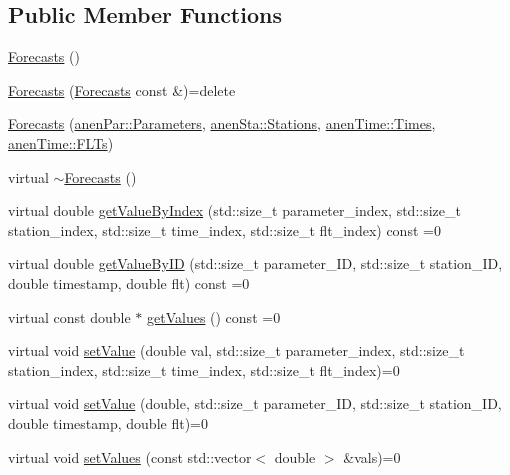 \subsection*{Public Member Functions}
\begin{DoxyCompactItemize}
\item 
\mbox{\hyperlink{class_forecasts_a2614be37bc63171f7d2b9d8b9f9d8871}{Forecasts}} ()
\item 
\mbox{\hyperlink{class_forecasts_a6f47e34b9ae9bb9496149208e3246d65}{Forecasts}} (\mbox{\hyperlink{class_forecasts}{Forecasts}} const \&)=delete
\item 
\mbox{\hyperlink{class_forecasts_a9170f0dd3065f443e19b4280dc2bee2d}{Forecasts}} (\mbox{\hyperlink{classanen_par_1_1_parameters}{anen\+Par\+::\+Parameters}}, \mbox{\hyperlink{classanen_sta_1_1_stations}{anen\+Sta\+::\+Stations}}, \mbox{\hyperlink{classanen_time_1_1_times}{anen\+Time\+::\+Times}}, \mbox{\hyperlink{classanen_time_1_1_f_l_ts}{anen\+Time\+::\+F\+L\+Ts}})
\item 
virtual \mbox{\hyperlink{class_forecasts_a340fd19812d62efc334fe4d23ff8dcd2}{$\sim$\+Forecasts}} ()
\item 
virtual double \mbox{\hyperlink{class_forecasts_a22471db4cab8b0e686e4eb216844ebd0}{get\+Value\+By\+Index}} (std\+::size\+\_\+t parameter\+\_\+index, std\+::size\+\_\+t station\+\_\+index, std\+::size\+\_\+t time\+\_\+index, std\+::size\+\_\+t flt\+\_\+index) const =0
\item 
virtual double \mbox{\hyperlink{class_forecasts_a1f2249027814ba541362e700d206ae55}{get\+Value\+By\+ID}} (std\+::size\+\_\+t parameter\+\_\+\+ID, std\+::size\+\_\+t station\+\_\+\+ID, double timestamp, double flt) const =0
\item 
virtual const double $\ast$ \mbox{\hyperlink{class_forecasts_a329d00c8a677da77c514908182fda0b6}{get\+Values}} () const =0
\item 
virtual void \mbox{\hyperlink{class_forecasts_a4ce21957ef296384b1e251098db953bc}{set\+Value}} (double val, std\+::size\+\_\+t parameter\+\_\+index, std\+::size\+\_\+t station\+\_\+index, std\+::size\+\_\+t time\+\_\+index, std\+::size\+\_\+t flt\+\_\+index)=0
\item 
virtual void \mbox{\hyperlink{class_forecasts_a584820dc47f1b5c4cae099485ee59cbe}{set\+Value}} (double, std\+::size\+\_\+t parameter\+\_\+\+ID, std\+::size\+\_\+t station\+\_\+\+ID, double timestamp, double flt)=0
\item 
virtual void \mbox{\hyperlink{class_forecasts_ae2a59385e03dd372fef3dfe89f5a31cf}{set\+Values}} (const std\+::vector$<$ double $>$ \&vals)=0

\end{DoxyCompactItemize}
